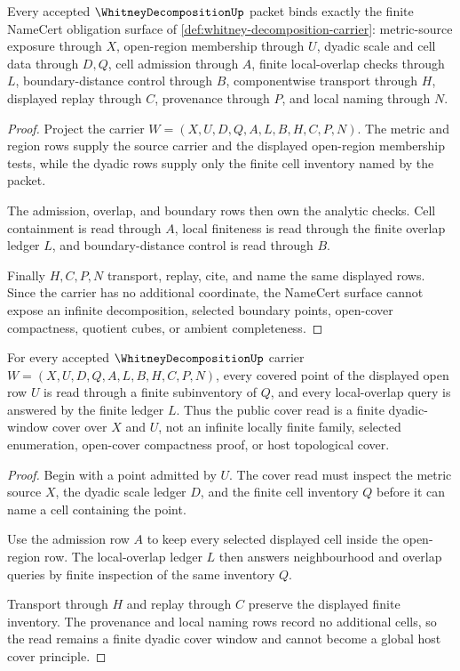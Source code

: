 \begin{theorem}
\label{thm:whitney-decomposition-namecert-obligations}
Every accepted $\WhitneyDecompositionUp$ packet binds exactly the finite NameCert obligation surface of \autoref{def:whitney-decomposition-carrier}: metric-source exposure through $X$, open-region membership through $U$, dyadic scale and cell data through $D,Q$, cell admission through $A$, finite local-overlap checks through $L$, boundary-distance control through $B$, componentwise transport through $H$, displayed replay through $C$, provenance through $P$, and local naming through $N$.
\end{theorem}
\begin{proof}
Project the carrier $W=(X,U,D,Q,A,L,B,H,C,P,N)$. The metric and region rows supply the source carrier and the displayed open-region membership tests, while the dyadic rows supply only the finite cell inventory named by the packet.

The admission, overlap, and boundary rows then own the analytic checks. Cell containment is read through $A$, local finiteness is read through the finite overlap ledger $L$, and boundary-distance control is read through $B$.

Finally $H,C,P,N$ transport, replay, cite, and name the same displayed rows. Since the carrier has no additional coordinate, the NameCert surface cannot expose an infinite decomposition, selected boundary points, open-cover compactness, quotient cubes, or ambient completeness.
\end{proof}

\begin{theorem}
\label{thm:whitney-decomposition-local-finite-cover}
For every accepted $\WhitneyDecompositionUp$ carrier $W=(X,U,D,Q,A,L,B,H,C,P,N)$, every covered point of the displayed open row $U$ is read through a finite subinventory of $Q$, and every local-overlap query is answered by the finite ledger $L$. Thus the public cover read is a finite dyadic-window cover over $X$ and $U$, not an infinite locally finite family, selected enumeration, open-cover compactness proof, or host topological cover.
\end{theorem}
\begin{proof}
Begin with a point admitted by $U$. The cover read must inspect the metric source $X$, the dyadic scale ledger $D$, and the finite cell inventory $Q$ before it can name a cell containing the point.

Use the admission row $A$ to keep every selected displayed cell inside the open-region row. The local-overlap ledger $L$ then answers neighbourhood and overlap queries by finite inspection of the same inventory $Q$.

Transport through $H$ and replay through $C$ preserve the displayed finite inventory. The provenance and local naming rows record no additional cells, so the read remains a finite dyadic cover window and cannot become a global host cover principle.
\end{proof}

